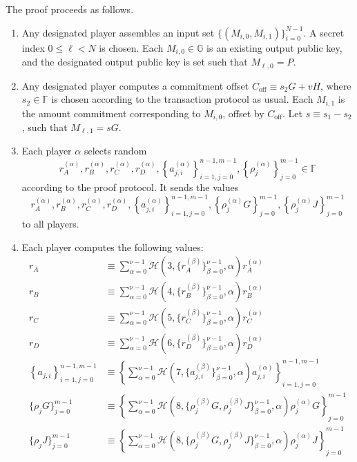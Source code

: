 \documentclass{article}
\newcommand{\F}{\mathbb{F}}
\newcommand{\G}{\mathbb{G}}
\newcommand{\hs}{\mathcal{H}}
\begin{document}
The proof proceeds as follows.
\begin{enumerate}
    \item Any designated player assembles an input set $\{(M_{i,0}, M_{i,1})\}_{i=0}^{N-1}$.
    A secret index $0 \leq \ell < N$ is chosen. Each $M_{i,0} \in \G$ is an existing output public key, and the designated output public key is set such that $M_{\ell,0} = P$.
    \item Any designated player computes a commitment offset $C_{\operatorname{off}} \equiv s_2 G + vH$, where $s_2 \in \F$ is chosen according to the transaction protocol as usual.
    Each $M_{i,1}$ is the amount commitment corresponding to $M_{i,0}$, offset by $C_{\operatorname{off}}$.
    Let $s \equiv s_1 - s_2$, such that $M_{\ell,1} = sG$.
    \item Each player $\alpha$ selects random $$r_A^{(\alpha)}, r_B^{(\alpha)}, r_C^{(\alpha)}, r_D^{(\alpha)}, \left\{a_{j,i}^{(\alpha)}\right\}_{i=1,j=0}^{n-1,m-1}, \left\{\rho_j^{(\alpha)}\right\}_{j=0}^{m-1} \in \F$$ according to the proof protocol.
    It sends the values $$r_A^{(\alpha)}, r_B^{(\alpha)}, r_C^{(\alpha)}, r_D^{(\alpha)}, \left\{a_{j,i}^{(\alpha)}\right\}_{i=1,j=0}^{n-1,m-1}, \left\{\rho_j^{(\alpha)}G\right\}_{j=0}^{m-1}, \left\{\rho_j^{(\alpha)}J\right\}_{j=0}^{m-1}$$ to all players.
    \item Each player computes the following values:
        \begin{align*}
            r_A &\equiv \sum_{\alpha=0}^{\nu-1} \hs(3, \{r_A^{(\beta)}\}_{\beta=0}^{\nu-1}, \alpha) r_A^{(\alpha)} \\
            r_B &\equiv \sum_{\alpha=0}^{\nu-1} \hs(4, \{r_B^{(\beta)}\}_{\beta=0}^{\nu-1}, \alpha) r_B^{(\alpha)} \\
            r_C &\equiv \sum_{\alpha=0}^{\nu-1} \hs(5, \{r_C^{(\beta)}\}_{\beta=0}^{\nu-1}, \alpha) r_C^{(\alpha)} \\
            r_D &\equiv \sum_{\alpha=0}^{\nu-1} \hs(6, \{r_D^{(\beta)}\}_{\beta=0}^{\nu-1}, \alpha) r_D^{(\alpha)} \\
            \left\{a_{j,i}\right\}_{i=1,j=0}^{n-1,m-1} &\equiv \left\{\sum_{\alpha=0}^{\nu-1} \hs(7, \{a_{j,i}^{(\beta)}\}_{\beta=0}^{\nu-1}, \alpha) a_{j,i}^{(\alpha)}\right\}_{i=1,j=0}^{n-1,m-1} \\
            \{\rho_j G\}_{j=0}^{m-1} &\equiv \left\{\sum_{\alpha=0}^{\nu-1} \hs(8, \{\rho_j^{(\beta)}G, \rho_j^{(\beta)}J\}_{\beta=0}^{\nu-1}, \alpha) \rho_j^{(\alpha)}G\right\}_{j=0}^{m-1} \\
            \{\rho_j J\}_{j=0}^{m-1} &\equiv \left\{\sum_{\alpha=0}^{\nu-1} \hs(8, \{\rho_j^{(\beta)}G, \rho_j^{(\beta)}J\}_{\beta=0}^{\nu-1}, \alpha) \rho_j^{(\alpha)}J\right\}_{j=0}^{m-1}

\end{align*}
\end{enumerate}
\end{document}
